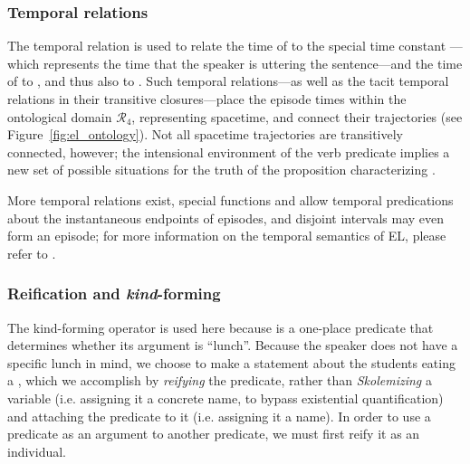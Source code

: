 \subsubsection{Temporal relations}
The temporal relation  is used to relate the time of  to the special time constant ---which represents the time that the speaker is uttering the sentence---and the time of  to , and thus also  to . Such temporal relations---as well as the tacit temporal relations in their transitive closures---place the episode times within the ontological domain $\mathcal{R}_{4}$, representing spacetime, and connect their trajectories (see Figure~\ref{fig:el_ontology}). Not all spacetime trajectories are transitively connected, however; the intensional environment of the verb predicate  implies a new set of possible situations for the truth of the  proposition characterizing .

More temporal relations exist, special functions  and  allow temporal predications about the instantaneous endpoints of episodes, and disjoint intervals may even form an episode; for more information on the temporal semantics of EL, please refer to \citep{hwang1993}.

\subsubsection{Reification and \textit{kind}-forming}
The kind-forming operator  is used here because  is a one-place predicate that determines whether its argument is ``lunch''. Because the speaker does not have a specific lunch in mind, we choose to make a statement about the students eating a , which we accomplish by \textit{reifying} the  predicate, rather than \textit{Skolemizing} a variable (i.e. assigning it a concrete name, to bypass existential quantification) and attaching the predicate to it (i.e. assigning it a name). In order to use a predicate as an argument to another predicate, we must first reify it as an individual.

